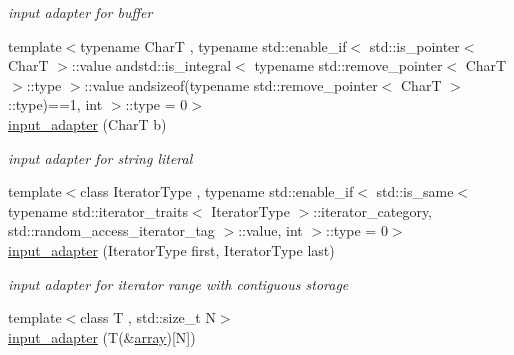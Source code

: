 \begin{DoxyCompactItemize}
\begin{DoxyCompactList}\small\item\em input adapter for buffer \end{DoxyCompactList}\item 
{\footnotesize template$<$typename CharT , typename std\+::enable\+\_\+if$<$ std\+::is\+\_\+pointer$<$ Char\+T $>$\+::value andstd\+::is\+\_\+integral$<$ typename std\+::remove\+\_\+pointer$<$ Char\+T $>$\+::type $>$\+::value andsizeof(typename std\+::remove\+\_\+pointer$<$ Char\+T $>$\+::type)==1, int $>$\+::type  = 0$>$ }\\\hyperlink{classnlohmann_1_1detail_1_1input__adapter_a86f035d9c4319360014b922b5e433ced}{input\+\_\+adapter} (CharT b)\hypertarget{classnlohmann_1_1detail_1_1input__adapter_a86f035d9c4319360014b922b5e433ced}{}\label{classnlohmann_1_1detail_1_1input__adapter_a86f035d9c4319360014b922b5e433ced}

\begin{DoxyCompactList}\small\item\em input adapter for string literal \end{DoxyCompactList}\item 
{\footnotesize template$<$class Iterator\+Type , typename std\+::enable\+\_\+if$<$ std\+::is\+\_\+same$<$ typename std\+::iterator\+\_\+traits$<$ Iterator\+Type $>$\+::iterator\+\_\+category, std\+::random\+\_\+access\+\_\+iterator\+\_\+tag $>$\+::value, int $>$\+::type  = 0$>$ }\\\hyperlink{classnlohmann_1_1detail_1_1input__adapter_ad6824b0f792691f75186c527fa31a6b4}{input\+\_\+adapter} (Iterator\+Type first, Iterator\+Type last)\hypertarget{classnlohmann_1_1detail_1_1input__adapter_ad6824b0f792691f75186c527fa31a6b4}{}\label{classnlohmann_1_1detail_1_1input__adapter_ad6824b0f792691f75186c527fa31a6b4}

\begin{DoxyCompactList}\small\item\em input adapter for iterator range with contiguous storage \end{DoxyCompactList}\item 
{\footnotesize template$<$class T , std\+::size\+\_\+t N$>$ }\\\hyperlink{classnlohmann_1_1detail_1_1input__adapter_aa2392138bf8307df1994dc7eb22d51ce}{input\+\_\+adapter} (T(\&\hyperlink{namespacenlohmann_1_1detail_a1ed8fc6239da25abcaf681d30ace4985af1f713c9e000f5d3f280adbd124df4f5}{array})\mbox{[}N\mbox{]})\hypertarget{classnlohmann_1_1detail_1_1input__adapter_aa2392138bf8307df1994dc7eb22d51ce}{}\label{classnlohmann_1_1detail_1_1input__adapter_aa2392138bf8307df1994dc7eb22d51ce}


\end{DoxyCompactItemize}
